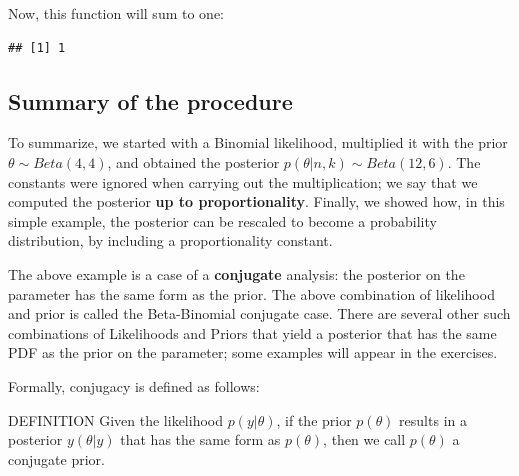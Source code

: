 \documentclass[12pt,]{krantz}
\newenvironment{Shaded}{\begin{snugshade}}{\end{snugshade}}
\newcommand{\ControlFlowTok}[1]{\textcolor[rgb]{0.13,0.29,0.53}{\textbf{#1}}}
\newcommand{\DataTypeTok}[1]{\textcolor[rgb]{0.13,0.29,0.53}{#1}}
\newcommand{\DecValTok}[1]{\textcolor[rgb]{0.00,0.00,0.81}{#1}}
\newcommand{\KeywordTok}[1]{\textcolor[rgb]{0.13,0.29,0.53}{\textbf{#1}}}
\newcommand{\NormalTok}[1]{#1}
\newcommand{\OperatorTok}[1]{\textcolor[rgb]{0.81,0.36,0.00}{\textbf{#1}}}
\newcommand{\StringTok}[1]{\textcolor[rgb]{0.31,0.60,0.02}{#1}}
\renewenvironment{quote}{\begin{VF}}{\end{VF}}
\theoremstyle{definition}
\theoremstyle{definition}
\theoremstyle{definition}
\theoremstyle{remark}
\begin{document}
Now, this function will sum to one:

\begin{Shaded}
\end{Shaded}

\begin{verbatim}
## [1] 1
\end{verbatim}

\hypertarget{summary-of-the-procedure}{%
\subsection{Summary of the procedure}\label{summary-of-the-procedure}}

To summarize, we started with a Binomial likelihood, multiplied it with the prior \(\theta \sim Beta(4,4)\), and obtained the posterior \(p(\theta|n,k) \sim Beta(12,6)\). The constants were ignored when carrying out the multiplication; we say that we computed the posterior \textbf{up to proportionality}. Finally, we showed how, in this simple example, the posterior can be rescaled to become a probability distribution, by including a proportionality constant.

The above example is a case of a \textbf{conjugate} analysis: the posterior on the parameter has the same form as the prior. The above combination of likelihood and prior is called the Beta-Binomial conjugate case. There are several other such combinations of Likelihoods and Priors that yield a posterior that has the same PDF as the prior on the parameter; some examples will appear in the exercises.

Formally, conjugacy is defined as follows:

\begin{quote}
DEFINITION
Given the likelihood \(p(y| \theta)\), if the prior \(p(\theta)\) results in a posterior \(y(\theta|y)\) that has the same form as \(p(\theta)\), then we call \(p(\theta)\) a conjugate prior.
\end{quote}
\end{document}
